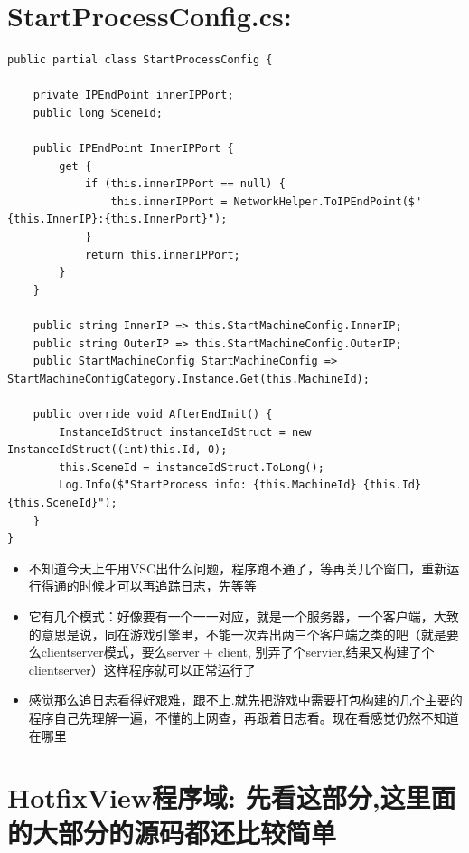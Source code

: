 \documentclass[9pt, b5paper]{article}
\begin{document}
\section{StartProcessConfig.cs:}
\label{sec-20}
\begin{verbatim}
public partial class StartProcessConfig {

    private IPEndPoint innerIPPort;
    public long SceneId;

    public IPEndPoint InnerIPPort {
        get {
            if (this.innerIPPort == null) {
                this.innerIPPort = NetworkHelper.ToIPEndPoint($"{this.InnerIP}:{this.InnerPort}");
            }
            return this.innerIPPort;
        }
    }

    public string InnerIP => this.StartMachineConfig.InnerIP;
    public string OuterIP => this.StartMachineConfig.OuterIP;
    public StartMachineConfig StartMachineConfig => StartMachineConfigCategory.Instance.Get(this.MachineId);

    public override void AfterEndInit() {
        InstanceIdStruct instanceIdStruct = new InstanceIdStruct((int)this.Id, 0);
        this.SceneId = instanceIdStruct.ToLong();
        Log.Info($"StartProcess info: {this.MachineId} {this.Id} {this.SceneId}");
    }
}
\end{verbatim}
\begin{itemize}
\item 不知道今天上午用VSC出什么问题，程序跑不通了，等再关几个窗口，重新运行得通的时候才可以再追踪日志，先等等
\item 它有几个模式：好像要有一个一一对应，就是一个服务器，一个客户端，大致的意思是说，同在游戏引擎里，不能一次弄出两三个客户端之类的吧（就是要么clientserver模式，要么server + client, 别弄了个servier,结果又构建了个clientserver）这样程序就可以正常运行了
\item 感觉那么追日志看得好艰难，跟不上.就先把游戏中需要打包构建的几个主要的程序自己先理解一遍，不懂的上网查，再跟着日志看。现在看感觉仍然不知道在哪里
\end{itemize}
\section{HotfixView程序域: 先看这部分,这里面的大部分的源码都还比较简单}
\label{sec-21}
\end{document}
